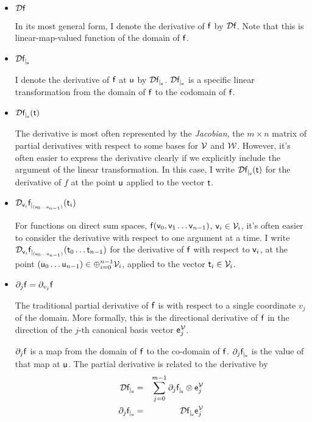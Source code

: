 \begin{itemize}

\item ${\mathcal{D}{\mathsf{f}}}$

In its most general form,
I denote the derivative of $\mathsf{f}$ by ${\mathcal{D}{\mathsf{f}}}$.
Note that this is linear-map-valued function of the domain of $\mathsf{f}$.

\item ${\mathcal{D}{\mathsf{f}}_{\mid_{\mathsf{u}}}}$

I denote the derivative of $\mathsf{f}$ at $\mathsf{u}$ by ${\mathcal{D}{\mathsf{f}}_{\mid_{\mathsf{u}}}}$.
${\mathcal{D}{\mathsf{f}}_{\mid_{\mathsf{u}}}}$ is a specific linear transformation from
the domain of $\mathsf{f}$ to the codomain of $\mathsf{f}$.

\item ${\mathcal{D}{\mathsf{f}}_{\mid_{\mathsf{u}}}({\mathsf{t}})}$

The derivative is most often represented by the {\it Jacobian},
the $m \times n$ matrix of partial derivatives
with respect to some bases for $\mathcal{V}$ and $\mathcal{W}$.
However, it's often easier to express the derivative clearly if we
explicitly include the argument of the linear transformation.
In this case, I write ${\mathcal{D}{\mathsf{f}}_{\mid_{\mathsf{u}}}({\mathsf{t}})}$
for the derivative of $f$ at the point $\mathsf{u}$
applied to the vector $\mathsf{t}$.

\item ${\mathcal{D}_{\mathsf{v}_i}{{\mathsf{f}}}_{\mid_{(\mathsf{u}_0 \ldots \mathsf{u}_{n-1})}}({{\mathsf{t}_i}})}$

For functions on direct sum spaces,
$\mathsf{f}(\mathsf{v}_0,\mathsf{v}_1 \ldots \mathsf{v}_{n-1})$, $\mathsf{v}_i \in \mathcal{V}_i$,
it's often easier to consider the derivative
with respect to one argument at a time.
I write ${\mathcal{D}_{\mathsf{v}_i}{{\mathsf{f}}}_{\mid_{(\mathsf{u}_0 \ldots \mathsf{u}_{n-1})}}({{\mathsf{t}_0 \ldots \mathsf{t}_{n-1}}})}$
for the derivative of $\mathsf{f}$ with respect to $\mathsf{v}_i$,
at the point $(\mathsf{u}_0 \ldots \mathsf{u}_{n-1}) \in \oplus_{i=0}^{n-1} \mathcal{V}_i$,
applied to the vector $\mathsf{t}_i \in \mathcal{V}_i$.

\item ${\partial}_{j}{\mathsf{f}} = {\partial}_{v_j}{\mathsf{f}}$

The traditional partial derivative of $\mathsf{f}$ is with respect to
a single coordinate $v_j$ of the domain.
More formally, this is the directional derivative of $\mathsf{f}$
in the direction of the $j$-th canonical basis vector $\mathsf{e}_j^{\mathcal{V}}$.

${\partial}_{j}{\mathsf{f}}$ is a map from the domain of $\mathsf{f}$ to the co-domain of $\mathsf{f}$.
${\partial}_{j}{\mathsf{f}}_{\mid_{\mathsf{u}}}$ is the value of that map at $\mathsf{u}$.
The partial derivative is related to the derivative by
\begin{eqnarray}
\label{eq:partial-full-dervatives}
{\mathcal{D}{\mathsf{f}}_{\mid_{\mathsf{u}}}}
& = &
\sum_{j=0}^{m-1} {\partial}_{j}{\mathsf{f}}_{\mid_{\mathsf{u}}} \otimes \mathsf{e}_j^{\mathcal{V}}
\\
{\partial}_{j}{\mathsf{f}}_{\mid_{\mathsf{u}}}
& = &
{\mathcal{D}{\mathsf{f}}_{\mid_{\mathsf{u}}}} \mathsf{e}_j^{\mathcal{V}}
\nonumber
\end{eqnarray}


\end{itemize}
